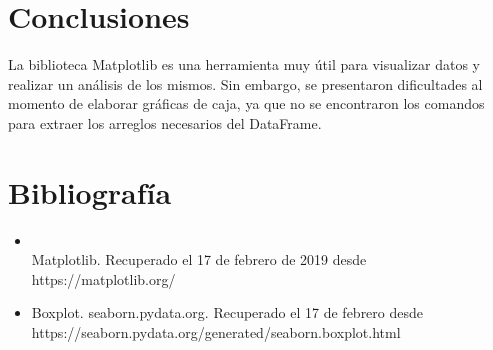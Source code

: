 \documentclass[letterpaper,12pt]{article}
\begin{document}
\section{Conclusiones}
La biblioteca Matplotlib es una herramienta muy útil para visualizar datos y realizar un análisis de los mismos. Sin embargo, se presentaron dificultades al momento de elaborar gráficas de caja, ya que no se encontraron los comandos para extraer los arreglos necesarios del DataFrame.

\section*{Bibliografía}
\begin{itemize}
\item \\Matplotlib. Recuperado el 17 de febrero de 2019 desde \\https://matplotlib.org/
\item Boxplot. seaborn.pydata.org. Recuperado el 17 de febrero desde\\       https://seaborn.pydata.org/generated/seaborn.boxplot.html
\end{itemize}
\end{document}

